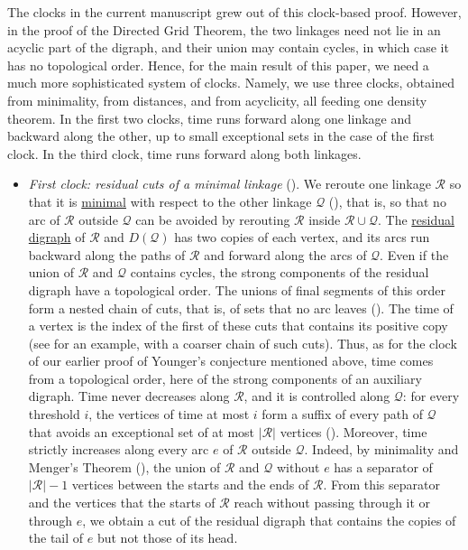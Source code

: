 \documentclass[fontsize=12pt,leading=14pt]{fullpaper}
\newcommand{\Qcal}{\mathcal{Q}}
\newcommand{\Rcal}{\mathcal{R}}
\begin{document}
 The clocks in the current manuscript grew out of this clock-based proof. However, in the proof of the Directed Grid Theorem, the two linkages need not lie in an acyclic part of the digraph, and their union may contain cycles, in which case it has no topological order. Hence, for the main result of this paper, we need a much more sophisticated system of clocks. Namely, we use three clocks, obtained from minimality, from distances, and from acyclicity, all feeding one density theorem. In the first two clocks, time runs forward along one linkage and backward along the other, up to small exceptional sets in the case of the first clock. In the third clock, time runs forward along both linkages.

\begin{itemize}
  \item \emph{First clock: residual cuts of a minimal linkage} ().
    We reroute one linkage $\Rcal$ so that it is \hyperref[def:minimal]{minimal} with respect to the other linkage $\Qcal$ (), that is, so that no arc of $\Rcal$ outside $\Qcal$ can be avoided by rerouting $\Rcal$ inside $\Rcal\cup\Qcal$.
    The \hyperref[def:residual]{residual digraph} of $\Rcal$ and $D(\Qcal)$ has two copies of each vertex, and its arcs run backward along the paths of $\Rcal$ and forward along the arcs of $\Qcal$.
    Even if the union of $\Rcal$ and $\Qcal$ contains cycles, the strong components of the residual digraph have a topological order.
    The unions of final segments of this order form a nested chain of cuts, that is, of sets that no arc leaves ().
    The time of a vertex is the index of the first of these cuts that contains its positive copy (see  for an example, with a coarser chain of such cuts).
    Thus, as for the clock of our earlier proof of Younger's conjecture mentioned above, time comes from a topological order, here of the strong components of an auxiliary digraph.
    Time never decreases along $\Rcal$, and it is controlled along $\Qcal$: for every threshold $i$, the vertices of time at most $i$ form a suffix of every path of $\Qcal$ that avoids an exceptional set of at most $|\Rcal|$ vertices ().
    Moreover, time strictly increases along every arc $e$ of $\Rcal$ outside $\Qcal$.
    Indeed, by minimality and Menger's Theorem (), the union of $\Rcal$ and $\Qcal$ without $e$ has a separator of $|\Rcal|-1$ vertices between the starts and the ends of $\Rcal$.
    From this separator and the vertices that the starts of $\Rcal$ reach without passing through it or through $e$, we obtain a cut of the residual digraph that contains the copies of the tail of $e$ but not those of its head.

\end{itemize}
\end{document}
